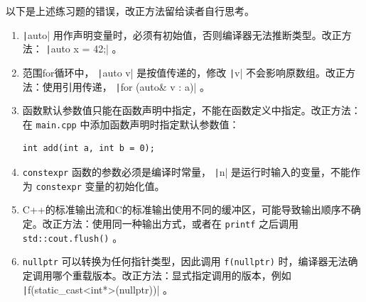\begin{answer}
    以下是上述练习题的错误，改正方法留给读者自行思考。
    \begin{enumerate}
        \item \texttt|auto| 用作声明变量时，必须有初始值，否则编译器无法推断类型。改正方法： \texttt|auto x = 42;| 。
        \item 范围for循环中， \texttt|auto v| 是按值传递的，修改 \texttt|v| 不会影响原数组。改正方法：使用引用传递， \texttt|for (auto& v : a)| 。
        \item 函数默认参数值只能在函数声明中指定，不能在函数定义中指定。改正方法：在 \texttt{main.cpp} 中添加函数声明时指定默认参数值：
\begin{verbatim}
int add(int a, int b = 0);
\end{verbatim}
        \item \texttt{constexpr} 函数的参数必须是编译时常量， \texttt|n| 是运行时输入的变量，不能作为 \texttt{constexpr} 变量的初始化值。
        \item C++的标准输出流和C的标准输出使用不同的缓冲区，可能导致输出顺序不确定。改正方法：使用同一种输出方式，或者在 \texttt{printf} 之后调用 \texttt{std::cout.flush()} 。
        \item \texttt{nullptr} 可以转换为任何指针类型，因此调用 \texttt{f(nullptr)} 时，编译器无法确定调用哪个重载版本。改正方法：显式指定调用的版本，例如 \texttt|f(static_cast<int*>(nullptr))| 。
    \end{enumerate}
\end{answer}
